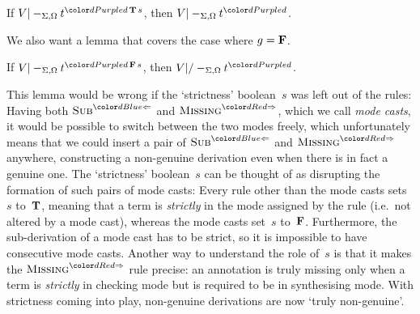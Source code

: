 \begin{lemma}\label{thm:Pre?-true}
If\/ $V |-_{\Sigma,\Omega} t^{\dir{d}\,\BTrue\,s}$, then $V |-_{\Sigma,\Omega} t^\dir{d}$.
\end{lemma}


We also want a lemma that covers the case where $g = \mathbf{F}$.

\begin{lemma}\label{thm:Pre?-false}
If\/ $V |-_{\Sigma,\Omega} t^{\dir{d}\,\BFalse\,s}$, then $V |/-_{\Sigma,\Omega} t^\dir{d}$.
\end{lemma}

This lemma would be wrong if the `strictness' boolean~$s$ was left out of the rules:
Having both $\ChkRule{Sub}$ and $\SynRule{Missing}$, which we call \emph{mode casts}, it would be possible to switch between the two modes freely, which unfortunately means that we could insert a pair of $\ChkRule{Sub}$ and $\SynRule{Missing}$ anywhere, constructing a non-genuine derivation even when there is in fact a genuine one.
The `strictness' boolean~$s$ can be thought of as disrupting the formation of such pairs of mode casts:
Every rule other than the mode casts sets~$s$ to~$\mathbf{T}$, meaning that a term is \emph{strictly} in the mode assigned by the rule (i.e.~not altered by a mode cast), whereas the mode casts set~$s$ to~$\mathbf{F}$.
Furthermore, the sub-derivation of a mode cast has to be strict, so it is impossible to have consecutive mode casts.
Another way to understand the role of~$s$ is that it makes the $\SynRule{Missing}$ rule precise: an annotation is truly missing only when a term is \emph{strictly} in checking mode but is required to be in synthesising mode.
With strictness coming into play, non-genuine derivations are now `truly non-genuine'.

